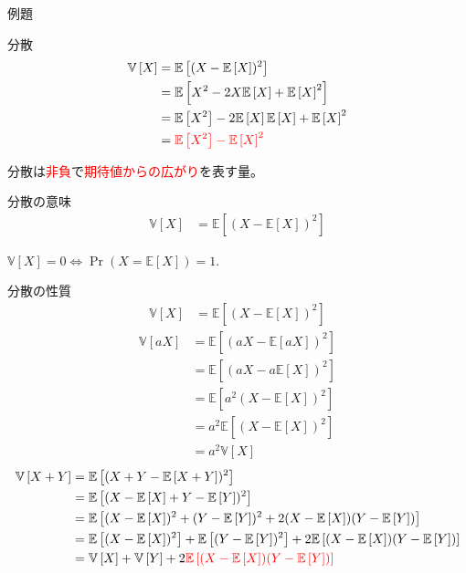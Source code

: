 \documentclass[lualatex,handout]{beamer}
\newcommand{\emm}[1]{\textcolor{red}{#1}}
\newcommand{\expt}[1]{\mathbb{E}\left[#1\right]}
\newcommand{\var}[1]{\mathbb{V}\left[#1\right]}
\theoremstyle{definition}
\begin{document}
\begin{frame}{例題}
\end{frame}

\begin{frame}{分散}
\begin{align*}
\var{X} &= \expt{(X-\expt{X})^2}\\
&=\expt{X^2-2X\expt{X}+\expt{X}^2}\\
&=\expt{X^2}-2\expt{X}\expt{X}+\expt{X}^2\\
&=\emm{\expt{X^2}-\expt{X}^2}\\
\end{align*}
\begin{center}
分散は\emm{非負}で\emm{期待値からの広がり}を表す量。
\end{center}
\end{frame}

\begin{frame}{分散の意味}
\begin{align*}
\var{X} &= \expt{(X-\expt{X})^2}
\end{align*}

$\var{X} = 0 \iff \Pr(X = \expt{X})=1$.
\end{frame}

\begin{frame}{分散の性質}
\small
\begin{align*}
\var{X} &= \expt{(X-\expt{X})^2}
\end{align*}
\begin{align*}
\var{aX} &= \expt{(aX-\expt{aX})^2}\\
&= \expt{(aX-a\expt{X})^2}\\
&= \expt{a^2(X-\expt{X})^2}\\
&= a^2\expt{(X-\expt{X})^2}\\
&= a^2\var{X}
\end{align*}
%
\begin{align*}
\var{X+Y} &= \expt{(X+Y-\expt{X+Y})^2}\\
 &= \expt{(X-\expt{X}+Y-\expt{Y})^2}\\
 &= \expt{(X-\expt{X})^2+(Y-\expt{Y})^2 + 2(X-\expt{X})(Y-\expt{Y})}\\
 &= \expt{(X-\expt{X})^2}+\expt{(Y-\expt{Y})^2} + 2\expt{(X-\expt{X})(Y-\expt{Y})}\\
 &= \var{X}+\var{Y}+ 2\emm{\expt{(X-\expt{X})(Y-\expt{Y})}}\\
\end{align*}
\end{frame}
\end{document}
